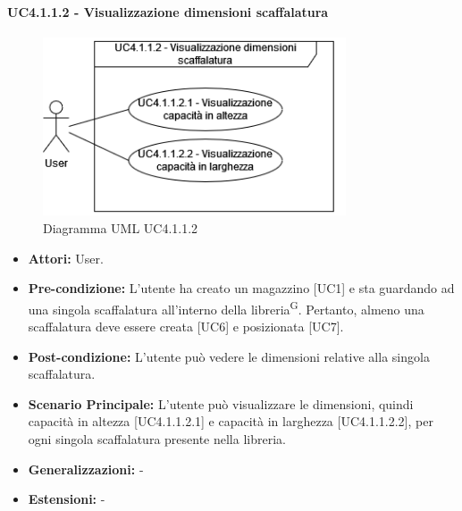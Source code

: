 \paragraph{UC4.1.1.2 - Visualizzazione dimensioni scaffalatura}
\begin{figure}[H]
  \centering
  \includegraphics[width=0.8\textwidth]{UC_diagrams_1-10/UC4.1.1.2.drawio.png}
   \caption{Diagramma UML UC4.1.1.2}
\end{figure}
\begin{itemize}
    \item \textbf{Attori:} User.
    \item \textbf{Pre-condizione:} L'utente ha creato un magazzino [UC1] e sta guardando ad una singola scaffalatura all'interno della libreria\textsuperscript{G}. Pertanto, almeno una scaffalatura deve essere creata [UC6] e posizionata [UC7].
    \item \textbf{Post-condizione:} L'utente può vedere le dimensioni relative alla singola scaffalatura.
    \item \textbf{Scenario Principale:} L'utente può visualizzare le dimensioni, quindi capacità in altezza [UC4.1.1.2.1] e capacità in larghezza [UC4.1.1.2.2], per ogni singola scaffalatura presente nella libreria.
    \item \textbf{Generalizzazioni:} -
    \item \textbf{Estensioni:} -
\end{itemize}


